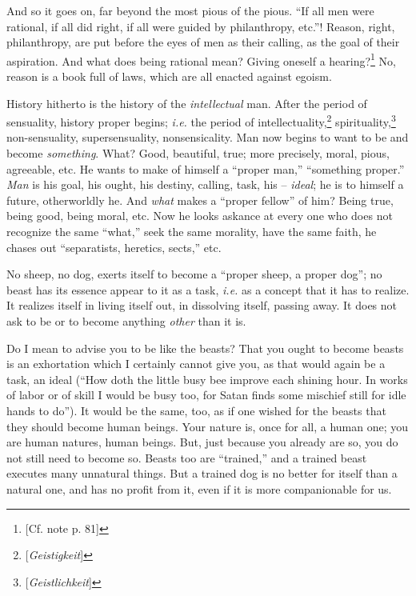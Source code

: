 And so it goes on, far beyond the most pious of the pious. ``If all men were 
rational, if all did right, if all were guided by philanthropy, etc.''! 
Reason, right, philanthropy, are put before the eyes of men as their calling, 
as the goal of their aspiration. And what does being rational mean? Giving 
oneself a hearing?\footnote{[Cf. note p. 81]} No, reason is a book full of 
laws, which are all enacted against egoism.

History hitherto is the history of the \textit{intellectual} man. After the 
period of sensuality, history proper begins; \textit{i.e.} the period of 
intellectuality,\footnote{[\textit{Geistigkeit}]} 
spirituality,\footnote{[\textit{Geistlichkeit}]} non-sensuality, 
supersensuality, nonsensicality. Man now begins to want to be and become 
\textit{something}. What? Good, beautiful, true; more precisely, moral, pious, 
agreeable, etc. He wants to make of himself a ``proper man,'' ``something 
proper.'' \textit{Man} is his goal, his ought, his destiny, calling, task, 
his -- \textit{ideal}; he is to himself a future, otherworldly he. And 
\textit{what} makes a ``proper fellow'' of him? Being true, being good, 
being moral, etc. Now he looks askance at every one who does not recognize the 
same ``what,'' seek the same morality, have the same faith, he chases out 
``separatists, heretics, sects,'' etc.

No sheep, no dog, exerts itself to become a ``proper sheep, a proper dog''; 
no beast has its essence appear to it as a task, \textit{i.e.} as a concept 
that it has to realize. It realizes itself in living itself out, in dissolving 
itself, passing away. It does not ask to be or to become anything 
\textit{other} than it is.

Do I mean to advise you to be like the beasts? That you ought to become beasts 
is an exhortation which I certainly cannot give you, as that would again be a 
task, an ideal (``How doth the little busy bee improve each shining hour. In 
works of labor or of skill I would be busy too, for Satan finds some mischief 
still for idle hands to do''). It would be the same, too, as if one wished 
for the beasts that they should become human beings. Your nature is, once for 
all, a human one; you are human natures, human beings. But, just because you 
already are so, you do not still need to become so. Beasts too are 
``trained,'' and a trained beast executes many unnatural things. But a 
trained dog is no better for itself than a natural one, and has no profit from 
it, even if it is more companionable for us.

